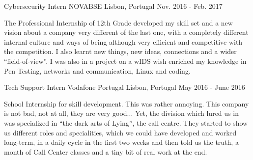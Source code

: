 \begin{cventries}

  \cventry
  {Cybersecurity Intern} %
  {NOVABSE} %
  {Lisbon, Portugal} %
  {Nov. 2016 - Feb. 2017} %
  { %
    \begin{cvitems}
      \item The Professional Internship of 12th Grade developed my skill set and a new vision about a company very different of the last one, with a completely different internal culture and ways of being although very efficient and competitive with the competition. I also learnt new things, new ideas, connections and a wider ``field-of-view''. I was also in a project on a wIDS wish enriched my knowledge in Pen Testing, networks and communication, Linux and coding.
    \end{cvitems}
  }


  \cventry
  {Tech Support Intern} %
  {Vodafone Portugal} %
  {Lisbon, Portugal} %
  {May 2016 - June 2016} %
  { %
    \begin{cvitems}
      \item School Internship for skill development.
      This was rather annoying. This company is not bad, not at all, they are very good... Yet, the division which lured us in was specialized in ``the dark arts of Lying'', the call centre.
      They started to show us different roles and specialities, which we could have developed and worked long-term, in a daily cycle in the first two weeks and then told us the truth, a month of Call Center classes and a tiny bit of real work at the end.
    \end{cvitems}
  }


\end{cventries}
